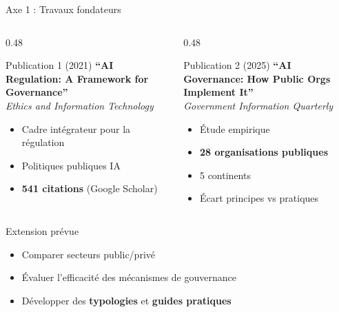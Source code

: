 \documentclass[aspectratio=169,11pt]{beamer}
\begin{document}
\begin{frame}{Axe 1 : Travaux fondateurs}
  \begin{columns}[T]
    \begin{column}{0.48\textwidth}
      \begin{block}{Publication 1 (2021)}
        \textbf{``AI Regulation: A Framework for Governance''}\\
        \textit{Ethics and Information Technology}
        \begin{itemize}\small
          \item Cadre intégrateur pour la régulation
          \item Politiques publiques IA
          \item \textbf{541 citations} (Google Scholar)
        \end{itemize}
      \end{block}
    \end{column}
    \begin{column}{0.48\textwidth}
      \begin{block}{Publication 2 (2025)}
        \textbf{``AI Governance: How Public Orgs Implement It''}\\
        \textit{Government Information Quarterly}
        \begin{itemize}\small
          \item Étude empirique
          \item \textbf{28 organisations publiques}
          \item 5 continents
          \item Écart principes vs pratiques
        \end{itemize}
      \end{block}
    \end{column}
  \end{columns}
  
  \vspace{0.5em}
  
  \begin{exampleblock}{Extension prévue}
    \small
    \begin{itemize}
      \item Comparer secteurs public/privé
      \item Évaluer l'efficacité des mécanismes de gouvernance
      \item Développer des \textbf{typologies} et \textbf{guides pratiques}
    \end{itemize}
  \end{exampleblock}
\end{frame}
\end{document}
